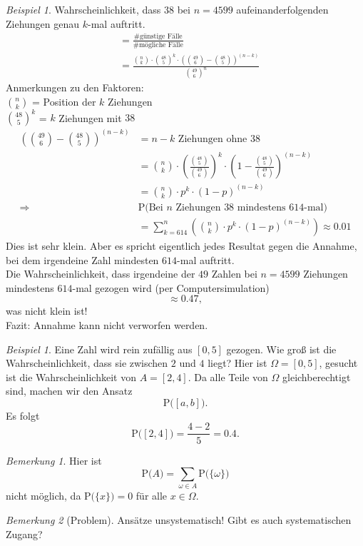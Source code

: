 \documentclass[a4paper,12pt,fleqn]{scrartcl}
\newcommand{\prob}[1]{\text{P(} #1 \text{)}}
\newcommand{\impl}{\Rightarrow}
\theoremstyle{definition}
\theoremstyle{plain}
\theoremstyle{remark}
\newtheorem*{bemerkung}{Bemerkung}
\newtheorem{beispiel}[definition]{Beispiel}
\begin{document}
\begin{beispiel}
Wahrscheinlichkeit, dass $38$ bei $n = 4599$ aufeinanderfolgenden Ziehungen genau $k$-mal auftritt.
\begin{align*}
&= \frac{\text{\# günstige Fälle}}{\text{\# mögliche Fälle}} \\
&= \frac{\binom{n}{k} \cdot \binom{48}{5}^k \cdot (\binom{49}{6} - \binom{48}{5})^{(n-k)} }{\binom{49}{6}^n}
\end{align*}
Anmerkungen zu den Faktoren: \\ 
$\binom{n}{k}$ = Position der $k$ Ziehungen \\
$\binom{48}{5}^k$ = $k$ Ziehungen mit $38$ \newpage
\begin{align*}
(\binom{49}{6} - \binom{48}{5})^{(n-k)} &= n-k \text{ Ziehungen ohne } 38 \\
&= \binom{n}{k} \cdot (\frac{\binom{48}{5}}{\binom{49}{6}})^k \cdot (1 - \frac{\binom{48}{5}}{\binom{49}{6}})^{(n-k)} \\
&= \binom{n}{k} \cdot p^k \cdot (1-p)^{(n-k)} \\
\impl &\prob{\text{Bei } n \text{ Ziehungen } 38 \text{ mindestens } 614\text{-mal}} \\
&=\sum_{k=614}^n (\binom{n}{k} \cdot p^k \cdot (1-p)^{(n-k)}) \approx 0.01
\end{align*}
Dies ist sehr klein. Aber es spricht eigentlich jedes Resultat gegen die Annahme, bei dem irgendeine Zahl mindesten $614$-mal auftritt. \\
Die Wahrscheinlichkeit, dass irgendeine der $49$ Zahlen bei $n=4599$ Ziehungen mindestens $614$-mal gezogen wird (per Computersimulation) 
\[\approx 0.47,\]
was nicht klein ist! \\
Fazit: Annahme kann nicht verworfen werden.
\end{beispiel}

\begin{beispiel}
Eine Zahl wird rein zufällig aus $\left[ 0,5\right]$ gezogen. Wie groß ist die Wahrscheinlichkeit, dass sie zwischen $2$ und $4$ liegt?  Hier ist $\Omega=\left[ 0,5\right]$, gesucht ist die Wahrscheinlichkeit von $A=\left[ 2,4\right]$. Da alle Teile von $\Omega$ \glqq gleichberechtigt\grqq \, sind, machen wir den Ansatz
\[\prob{\left[ a,b\right]}.\]
Es folgt
\[\prob{\left[ 2,4\right]}=\frac{4-2}{5}=0.4.\]
\begin{bemerkung}
Hier ist
\[\prob{A}=\sum_{\omega\in A}\prob{\{\omega \} }\]
nicht möglich, da $\prob{\{ x\} } = 0$ für alle $x\in\Omega$.
\end{bemerkung}
\end{beispiel}
\begin{bemerkung}[Problem]
Ansätze unsystematisch! Gibt es auch systematischen Zugang?
\end{bemerkung}
\end{document}
